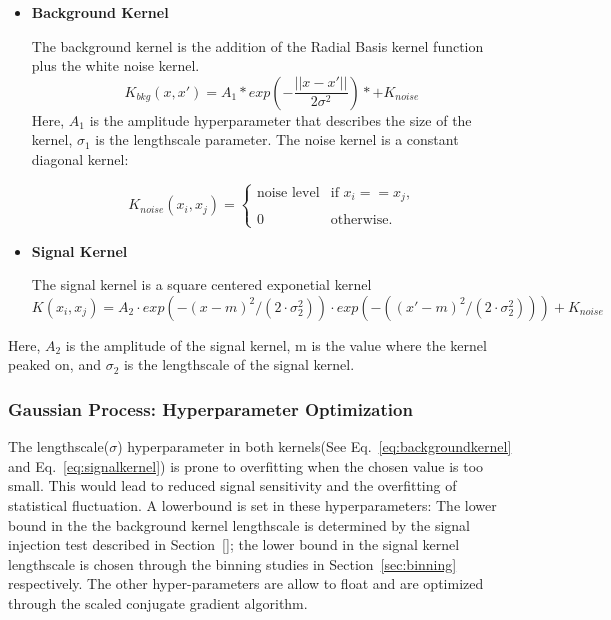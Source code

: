     \begin{itemize}
        \item \textbf{Background Kernel}

            The background kernel is the addition of the Radial Basis kernel function plus the white noise kernel.
            \begin{equation}
                K_{bkg}(x, x') = A_{1} * exp(-\frac{||x-x'||}{2\sigma^{2}}) *+ K_{noise}
            \end{equation}
            Here, $A_{1}$ is the amplitude hyperparameter that describes the size of the kernel, $\sigma_{1}$ is the lengthscale parameter.
            The noise kernel is a constant diagonal kernel:
            

			\begin{equation}
            K_{noise}(x_{i}, x_{j}) =
			\begin{cases} \text{noise level} & \text{if $x_{i}==x_{j}$,} \\
			\\
            0 & \text{otherwise.}
			\end{cases}
			\end{equation}

        \item \textbf{Signal Kernel}

            The signal kernel is a square centered exponetial kernel
            \begin{equation}
            K(x_{i}, x_{j})=A_{2}\cdot exp(-(x-m)^{2}/(2\cdot\sigma_{2}^{2}))\cdot exp(-((x'-m)^{2}/(2\cdot\sigma_{2}^{2}))) + K_{noise}
            \end{equation}

    \end{itemize}
            Here, $A_{2}$ is the amplitude of the signal kernel, m is the value where the kernel peaked on, and $\sigma_{2}$ is the lengthscale of the signal kernel. 
    \subsubsection{Gaussian Process: Hyperparameter Optimization}
    \label{sec:hyperparam}
    The lengthscale($\sigma$) hyperparameter in both kernels(See Eq.~\ref{eq:backgroundkernel} and Eq.~\ref{eq:signalkernel}) is prone to overfitting when the chosen value is too small. This would lead to reduced signal sensitivity and the overfitting of statistical fluctuation. A lowerbound is set in these hyperparameters: The lower bound in the the background kernel lengthscale is determined by the signal injection test described in Section~\ref{}; the lower bound in the signal kernel lengthscale is chosen through the binning studies in Section~\ref{sec:binning} respectively. The other hyper-parameters are allow to float and are optimized through the scaled conjugate gradient algorithm.

